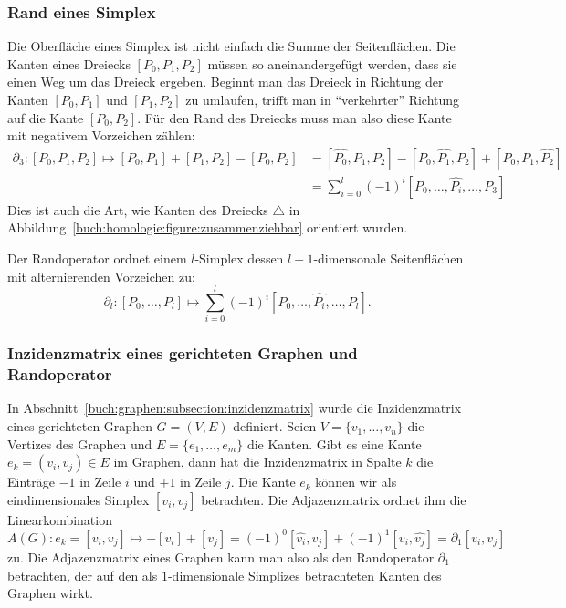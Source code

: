 \subsubsection{Rand eines Simplex}
Die Oberfläche eines Simplex ist nicht einfach die Summe der
Seitenflächen.
Die Kanten eines Dreiecks $[P_0,P_1,P_2]$ müssen so aneinandergefügt
werden, dass sie einen Weg um das Dreieck ergeben.
Beginnt man das Dreieck in Richtung der Kanten
$[P_0,P_1]$ und $[P_1,P_2]$ zu umlaufen, trifft man in
``verkehrter'' Richtung auf die Kante $[P_0,P_2]$.
Für den Rand des Dreiecks muss man also diese Kante mit negativem
Vorzeichen zählen:
\begin{align*}
\partial_3 \colon
[P_0,P_1,P_2]
\mapsto
[P_0,P_1]
+ [P_1,P_2]
- [P_0,P_2]
&=
[\widehat{P_0},P_1,P_2]
-[P_0,\widehat{P_1},P_2]
+[P_0,P_1,\widehat{P_2}]
\\
&=
\sum_{i=0}^l (-1)^i [P_0,\dots,\widehat{P_i},\dots,P_3]
\end{align*}
Dies ist auch die Art, wie Kanten des Dreiecks $\triangle$ 
in Abbildung~\ref{buch:homologie:figure:zusammenziehbar}
orientiert wurden.

\begin{definition}
\label{buch:def:randoperator}
Der Randoperator ordnet einem $l$-Simplex dessen $l-1$-dimensonale
Seitenflächen mit alternierenden Vorzeichen zu:
\[
\partial_l : [P_0,\dots,P_l]
\mapsto
\sum_{i=0}^l (-1)^i [P_0,\dots,\widehat{P_i},\dots,P_l].
\]
\end{definition}

\subsubsection{Inzidenzmatrix eines gerichteten Graphen und Randoperator}
In Abschnitt~\ref{buch:graphen:subsection:inzidenzmatrix} wurde die
Inzidenzmatrix eines gerichteten Graphen $G=(V,E)$ definiert.
Seien $V=\{v_1,\dots,v_n\}$ die Vertizes des Graphen und
$E=\{e_1,\dots,e_m\}$ die Kanten. 
Gibt es eine Kante $e_k = (v_i,v_j)\in E$ im Graphen, dann hat die Inzidenzmatrix
in Spalte $k$ die Einträge $-1$ in Zeile $i$ und $+1$ in Zeile $j$.
Die Kante $e_k$ können wir als eindimensionales Simplex $[v_i,v_j]$
betrachten.
Die Adjazenzmatrix ordnet ihm die Linearkombination
\[
A(G)\colon e_k=[v_i,v_j] \mapsto -[v_i] +[v_j]
= (-1)^0 [\widehat{v_i},v_j] + (-1)^1 [v_i,\widehat{v_j}]
=
\partial_1 [v_i,v_j]
\]
zu.
Die Adjazenzmatrix eines Graphen kann man also als den Randoperator
$\partial_1$ betrachten, der auf den als $1$-dimensionale Simplizes
betrachteten Kanten des Graphen wirkt.

